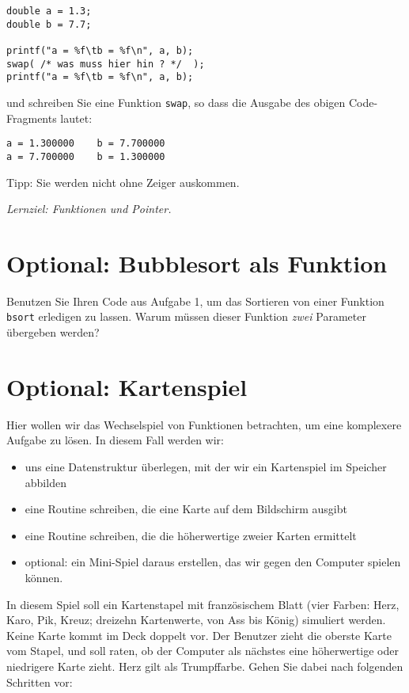 \documentclass[
	ngerman,
	fontsize=10pt,
	parskip=half,
	titlepage=true,
	DIV=12
]{scrartcl}
\begin{document}
{\begin{verbatim}
double a = 1.3;
double b = 7.7;

printf("a = %f\tb = %f\n", a, b);
swap( /* was muss hier hin ? */  );
printf("a = %f\tb = %f\n", a, b);
\end{verbatim}

und schreiben Sie eine Funktion \texttt{swap}, so dass die Ausgabe des obigen Code-Fragments lautet:

\begin{verbatim}
a = 1.300000	b = 7.700000
a = 7.700000	b = 1.300000
\end{verbatim}

Tipp: Sie werden nicht ohne Zeiger auskommen.

\emph{Lernziel: Funktionen und Pointer.}


\section{Optional: Bubblesort als Funktion}
Benutzen Sie Ihren Code aus Aufgabe 1, um das Sortieren von einer Funktion \texttt{bsort} erledigen zu lassen. Warum müssen dieser Funktion \emph{zwei} Parameter übergeben werden?


\section{Optional: Kartenspiel}
Hier wollen wir das Wechselspiel von Funktionen betrachten, um eine komplexere Aufgabe zu lösen. In diesem Fall werden wir:
\begin{itemize}
\item uns eine Datenstruktur überlegen, mit der wir ein Kartenspiel im Speicher abbilden
\item eine Routine schreiben, die eine Karte auf dem Bildschirm ausgibt
\item eine Routine schreiben, die die höherwertige zweier Karten ermittelt
\item optional: ein Mini-Spiel daraus erstellen, das wir gegen den Computer spielen können.
\end{itemize}

In diesem Spiel soll ein Kartenstapel mit französischem Blatt (vier Farben: Herz, Karo, Pik, Kreuz; dreizehn Kartenwerte, von Ass bis König) simuliert werden. Keine Karte kommt im Deck doppelt vor. Der Benutzer zieht die oberste Karte vom Stapel, und soll raten, ob der Computer als nächstes eine höherwertige oder niedrigere Karte zieht. Herz gilt als Trumpffarbe. Gehen Sie dabei nach folgenden Schritten vor:

}
\end{document}

